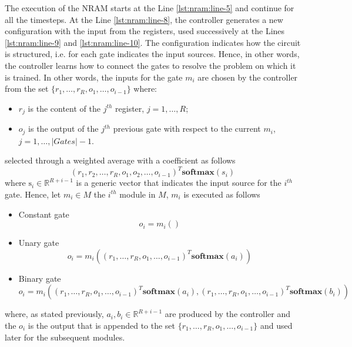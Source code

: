 The execution of the NRAM starts at the Line \ref{lst:nram:line-5} and continue for all the timesteps. At the Line \ref{lst:nram:line-8}, the controller generates a new configuration with the input from the registers, used successively at the Lines \ref{lst:nram:line-9} and \ref{lst:nram:line-10}. The configuration indicates how the circuit is structured, i.e. for each gate indicates the input sources. Hence, in other words, the controller learns how to connect the gates to resolve the problem on which it is trained. In other words, the inputs for the gate $m_i$ are chosen by the controller from the set $\{r_{1}, \dots, r_{R}, o_{1}, \dots, o_{i-1}\}$ where:
\begin{itemize}
	\item $r_j$ is the content of the $j^{th}$ register, $j=1,\dots,R$;
	\item $o_j$ is the output of the $j^{th}$ previous gate with respect to the current $m_i$, $j=1,\dots,|Gates| - 1$.
\end{itemize}
selected through a weighted average with a coefficient as follows
\begin{equation}
	(r_1, r_2, \dots, r_R, o_1, o_2, \dots, o_{i-1})^T\textbf{softmax}(s_i)
\end{equation}
where $\textrm{s}_i \in \mathbb{R}^{R+i-1}$ is a generic vector that indicates the input source for the $i^{th}$ gate. \newline
Hence, let $m_i \in M$ the $i^{th}$ module in $M$, $m_i$ is executed as follows
\begin{itemize}
	\item{Constant gate
		\begin{equation}
			o_i = m_i()
		\end{equation}
	}
	\item{Unary gate
		\begin{equation}
			o_i = m_i((r_1, \dots, r_R, o_1, \dots, o_{i-1})^T\textbf{softmax}(a_i))
		\end{equation}
	}
	\item{Binary gate
		\begin{equation}
			o_i = m_i((r_1, \dots, r_R, o_1, \dots, o_{i-1})^T\textbf{softmax}(a_i), (r_1, \dots, r_R, o_1, \dots, o_{i-1})^T\textbf{softmax}(b_i))
		\end{equation}
	}
\end{itemize}
where, as stated previously, $a_i, b_i \in \mathbb{R}^{R+i-1}$ are produced by the controller and the $o_i$ is the output that is appended to the set $\{r_{1}, \dots, r_{R}, o_{1}, \dots, o_{i-1}\}$ and used later for the subsequent modules.
